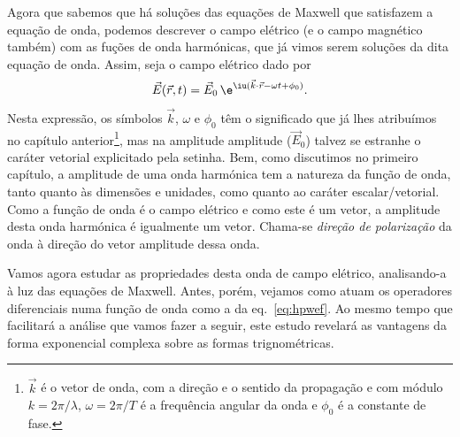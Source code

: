 Agora que sabemos que há soluções das equações de Maxwell que satisfazem a
equação de onda, podemos descrever o campo elétrico (e o campo magnético também) 
com as fuções de onda harmónicas, que já vimos serem soluções da dita equação de
onda. Assim, seja o campo elétrico dado por
\begin{equation}\label{eq:hpwef}
  \vec E(\vec r,t)=\vec E_0\,\e^{\iu(\vec k\cdot\vec r-\omega t+\phi_0)}.
\end{equation}
Nesta expressão, os símbolos $\vec k$, $\omega$ e $\phi_0$ têm o significado que
já lhes atribuímos no capítulo anterior\footnote{$\vec k$ é o vetor de onda, com
  a direção e o sentido da propagação e com módulo $k=2\pi/\lambda$,
$\omega=2\pi/T$ é a frequência angular da onda e $\phi_0$ é a constante de
fase.}, mas na amplitude amplitude ($\vec E_0$) talvez se estranhe o caráter
vetorial explicitado pela setinha. Bem, como discutimos no primeiro capítulo, a
amplitude de uma onda harmónica tem a natureza da função de onda, tanto quanto
às dimensões e unidades, como quanto ao caráter escalar/vetorial. Como a função
de onda é o campo elétrico e como este é um vetor, a amplitude desta onda
harmónica é igualmente um vetor. Chama-se \emph{direção de polarização} da onda
à direção do vetor amplitude dessa onda.

Vamos agora estudar as propriedades desta onda de campo elétrico, analisando-a à
luz das equações de Maxwell. Antes, porém, vejamos como atuam os operadores
diferenciais numa função de onda como a da eq.~\eqref{eq:hpwef}. Ao mesmo tempo
que facilitará a análise que vamos fazer a seguir, este estudo revelará as
vantagens da forma exponencial complexa sobre as formas trignométricas.

